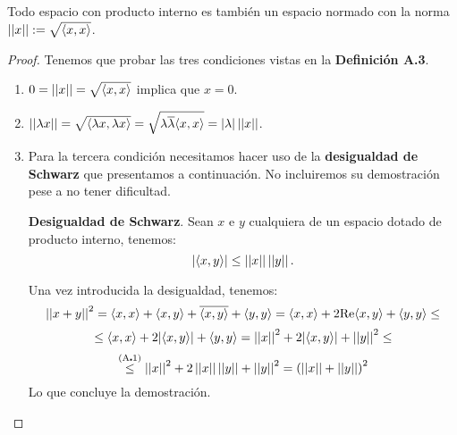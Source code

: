 \begin{proposition} Todo espacio con producto interno es también un espacio normado con la norma $\left|\left|x\right|\right|:=\sqrt{\langle x,x\rangle}$.
\begin{proof} Tenemos que probar las tres condiciones vistas en la \textbf{Definición A.3}.
\begin{enumerate}[label=\alph*)]
\item $0 = \left|\left|x\right|\right| = \sqrt{\langle x,x\rangle}$ implica que $x=0$.
\item $\left|\left|\lambda x\right|\right| = \sqrt{\langle\lambda x,\lambda x\rangle} = \sqrt{\lambda\overline{\lambda}\langle x,x\rangle}=|\lambda|\left|\left|x\right|\right|$.
\item Para la tercera condición necesitamos hacer uso de la \textbf{desigualdad de Schwarz} que presentamos a continuación. No incluiremos su demostración pese a no tener dificultad.

\begin{thm} \textbf{Desigualdad de Schwarz}. Sean $x$ e $y$ cualquiera de un espacio dotado de producto interno, tenemos:
\begin{equation}
|\langle x,y\rangle|\leq\left|\left|x\right|\right|\left|\left|y\right|\right|.
\end{equation}
\end{thm}
Una vez introducida la desigualdad, tenemos:
\[\left|\left|x+y\right|\right|^2 = \langle x,x\rangle + \langle x,y\rangle + \overline{\langle x,y\rangle} + \langle y,y\rangle = \langle x,x\rangle + 2\mathrm{Re}\langle x,y\rangle + \langle y,y\rangle \leq\]
\[\leq \langle x,x\rangle + 2|\langle x,y\rangle| + \langle y,y\rangle = \left|\left|x\right|\right|^2+ 2|\langle x,y\rangle|+\left|\left|y\right|\right|^2\leq\]
\[\overset{\mathrm{(A\centerdot1)}}{\leq}\left|\left|x\right|\right|^2+ 2\left|\left|x\right|\right|\left|\left|y\right|\right|+\left|\left|y\right|\right|^2 = \left(\left|\left|x\right|\right|+\left|\left|y\right|\right|\right)^2\]
Lo que concluye la demostración.
\end{enumerate}
\end{proof}
\end{proposition}